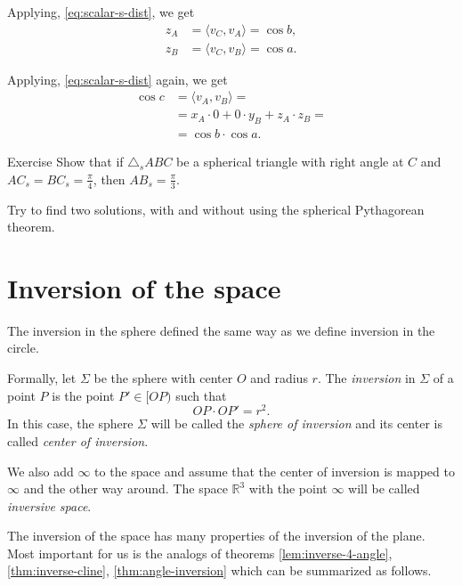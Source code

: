 Applying, \ref{eq:scalar-s-dist},
we get
\begin{align*}
z_A&=\langle v_C,v_A\rangle
=\cos b,
\\
z_B&=\langle v_C,v_B\rangle
=\cos a.
\end{align*}

Applying, \ref{eq:scalar-s-dist} again, we get
\begin{align*}
\cos c &=\langle v_A,v_B\rangle=
\\
&=x_A\cdot 0+0\cdot y_B+z_A\cdot z_B=
\\
&=\cos b\cdot\cos a.
\end{align*}
\qedsf

\begin{thm}{Exercise}\label{ex:2(pi/4)=pi/3}
Show that 
if $\triangle_sABC$ be a spherical triangle with right angle at $C$
and $AC_s=BC_s=\tfrac\pi4$, then $AB_s=\tfrac\pi3$.

Try to find two solutions, with and without using the spherical Pythagorean theorem.
\end{thm}

\section*{Inversion of the space}

The inversion in the sphere defined the same way as we define inversion in the circle.

Formally, let $\Sigma$ be the sphere with center $O$ and radius $r$.
The \emph{inversion} in $\Sigma$ of a point $P$ is the point $P'\in[OP)$ such that
$$OP\cdot OP'=r^2.$$
In this case, the sphere $\Sigma$  will be called the 
\emph{sphere of inversion} 
and its center is called \emph{center of inversion}.

We also add $\infty$ to the space and assume that the center of inversion is mapped to $\infty$ and the other way around. 
The space $\mathbb{R}^3$ with the point $\infty$ will be called \emph{inversive space}.

The inversion of the space 
has many properties 
of the inversion of the plane.
Most important for us is the analogs of theorems \ref{lem:inverse-4-angle}, \ref{thm:inverse-cline}, \ref{thm:angle-inversion} which can be summarized as follows.


